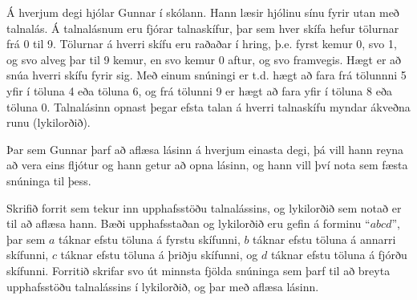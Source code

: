 \begin{problem}
	
	Á hverjum degi hjólar Gunnar í skólann. Hann læsir hjólinu sínu fyrir utan með talnalás. Á talnalásnum eru fjórar talnaskífur, þar sem hver skífa hefur tölurnar frá 0 til 9. Tölurnar á hverri skífu eru raðaðar í hring, þ.e. fyrst kemur 0, svo 1, og svo alveg þar til 9 kemur, en svo kemur 0 aftur, og svo framvegis. Hægt er að snúa hverri skífu fyrir sig. Með einum snúningi er t.d. hægt að fara frá tölunnni 5 yfir í töluna 4 eða töluna 6, og frá tölunni 9 er hægt að fara yfir í töluna 8 eða töluna 0. Talnalásinn opnast þegar efsta talan á hverri talnaskífu myndar ákveðna runu (lykilorðið).

	Þar sem Gunnar þarf að aflæsa lásinn á hverjum einasta degi, þá vill hann reyna að vera eins fljótur og hann getur að opna lásinn, og hann vill því nota sem fæsta snúninga til þess.

	Skrifið forrit sem tekur inn upphafsstöðu talnalássins, og lykilorðið sem notað er til að aflæsa hann. Bæði upphafsstaðan og lykilorðið eru gefin á forminu "`\texttt{$abcd$}"', þar sem $a$ táknar efstu töluna á fyrstu skífunni, $b$ táknar efstu töluna á annarri skífunni, $c$ táknar efstu töluna á þriðju skífunni, og $d$ táknar efstu töluna á fjórðu skífunni. Forritið skrifar svo út minnsta fjölda snúninga sem þarf til að breyta upphafsstöðu talnalássins í lykilorðið, og þar með aflæsa lásinn.

\begin{example}
%
\end{example}
\begin{example}
%
\end{example}
\begin{example}
%
\end{example}
\end{problem}